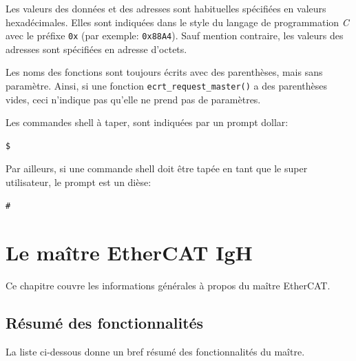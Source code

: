 \documentclass[a4paper,12pt,BCOR=6mm,bibtotoc,idxtotoc]{scrbook}
\begin{document}
Les valeurs des donn\'ees et des adresses sont habituelles
sp\'ecifi\'ees en valeurs hexad\'ecimales. Elles sont indiqu\'ees dans
le style du langage de programmation \textit{C} avec le pr\'efixe
\lstinline+0x+ (par exemple: \lstinline+0x88A4+). Sauf mention
contraire, les valeurs des adresses sont sp\'ecifi\'ees en adresse
d'octets.


Les noms des fonctions sont toujours \'ecrits avec des parenth\`eses,
mais sans param\`etre.  Ainsi, si une fonction
\lstinline+ecrt_request_master()+ a des parenth\`eses vides, ceci
n'indique pas qu'elle ne prend pas de param\`etres.

Les commandes shell \`a taper, sont indiqu\'ees par un prompt dollar:

\begin{lstlisting}
$
\end{lstlisting}

Par ailleurs, si une commande shell doit \^etre tap\'ee en tant que le
super utilisateur, le prompt est un di\`ese:

\begin{lstlisting}
#
\end{lstlisting}


\chapter{Le ma\^itre EtherCAT IgH}
\label{chapter:master}

Ce chapitre couvre les informations g\'en\'erales \`a propos du
ma\^itre EtherCAT.


\section{R\'esum\'e des fonctionnalit\'es}
\label{sec:summary}

La liste ci-dessous donne un bref r\'esum\'e des fonctionnalit\'es du
ma\^itre.
\end{document}
